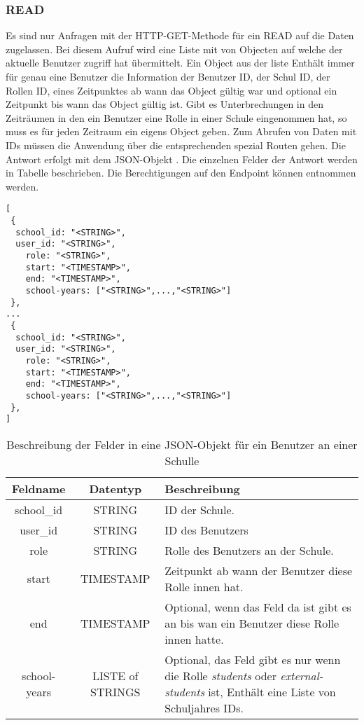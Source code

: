 
\subsubsection{READ}
\label{sec:rest:api:school:users:read}
Es sind nur Anfragen mit der HTTP-GET-Methode für ein READ auf die Daten zugelassen.
Bei diesem Aufruf wird eine Liste mit von Objecten auf welche der aktuelle Benutzer zugriff hat übermittelt.
Ein Object aus der liste Enthält immer für genau eine Benutzer die Information der Benutzer ID, der Schul ID, der Rollen ID, eines Zeitpunktes ab wann das Object gültig war und optional ein Zeitpunkt bis wann das Object gültig ist.
Gibt es Unterbrechungen in den Zeiträumen in den ein Benutzer eine Rolle in einer Schule eingenommen hat, so muss es für jeden Zeitraum ein eigens Object geben.
Zum Abrufen von Daten mit IDs müssen die Anwendung über die entsprechenden spezial Routen gehen.
Die Antwort erfolgt mit dem JSON-Objekt . 
Die einzelnen Felder der Antwort werden in Tabelle  beschrieben.
Die Berechtigungen auf den Endpoint können  entnommen werden.


\begin{lstlisting}[caption={JSON-Antwort für einen GET-Aufruf der Route /api/school/users},label={lst:code:end:rest:api:school:users:read:ret},frame=tlrb]
[
 {
  school_id: "<STRING>",
  user_id: "<STRING>",
	role: "<STRING>",
	start: "<TIMESTAMP>",
	end: "<TIMESTAMP>",
	school-years: ["<STRING>",...,"<STRING>"]
 },
...
 {
  school_id: "<STRING>",
  user_id: "<STRING>",
	role: "<STRING>",
	start: "<TIMESTAMP>",
	end: "<TIMESTAMP>",
	school-years: ["<STRING>",...,"<STRING>"]
 },
]
\end{lstlisting}

\begin{table}[htb]
	\begin{tabularx}{\textwidth}{|c|c|X|}
		\hline
			\textbf{Feldname} & \textbf{Datentyp} & \textbf{Beschreibung} \\ \hline
			school\_id & STRING & ID der Schule. \\ \hline
			user\_id & STRING & ID des Benutzers \\ \hline
			role & STRING & Rolle des Benutzers an der Schule. \\ \hline
			start & TIMESTAMP & Zeitpunkt ab wann der Benutzer diese Rolle innen hat. \\ \hline
			end & TIMESTAMP & Optional, wenn das Feld da ist gibt es an bis wan ein Benutzer diese Rolle innen hatte. \\ \hline
			school-years & LISTE of STRINGS & Optional, das Feld gibt es nur wenn die Rolle \textit{students} oder \textit{external-students} ist, Enthält eine Liste von Schuljahres IDs. \\ \hline 
	\end{tabularx}

		\caption{Beschreibung der Felder in eine JSON-Objekt für ein Benutzer an einer Schulle}
		\label{tab:end:rest:api:school:users:read:ret:json}
\end{table}

